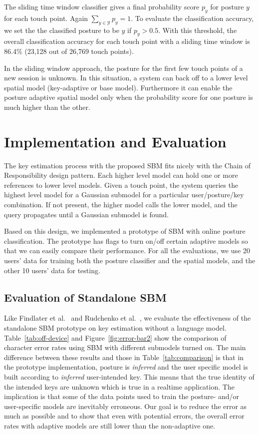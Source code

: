 \documentclass{sigchi}
\begin{document}
The sliding time window classifier gives a final probability score $p_y$ for posture
$y$ for each touch point. Again $\displaystyle\sum_{y\in \mathcal{Y}}p_y = 1$. To evaluate the classification accuracy, we set the the
classified posture to be $y$ if $p_y > 0.5$. With this threshold, the overall classification 
accuracy for each touch point with a sliding time window
is 86.4\% (23,128 out of 26,769 touch points).

In the sliding window approach, the posture for the first few touch points  
of a new session is unknown. In this situation, a system can back off to a lower level spatial 
model (key-adaptive or base model). Furthermore it can enable the posture 
adaptive spatial model only when the probability score for one posture is much 
higher than the other.

\section{Implementation and Evaluation}
The key estimation process with the proposed SBM fits nicely with the
Chain of Responsibility design pattern. Each higher level model can
hold one or more references to lower level models. Given a touch
point, the system queries the highest level model for a Gaussian
submodel for a particular user/posture/key combination. If not present, 
the higher model calls the lower model, and the
query propagates until a Gaussian submodel is found. 

Based on this design, we implemented a prototype of SBM with online posture 
classification. The prototype has flags to turn on/off certain adaptive
 models so that we can easily compare their performance. 
 For all the evaluations, we use 20 users' data for training both the posture classifier 
 and the spatial models, and the other 10 users' data for testing. 

\subsection{Evaluation of Standalone SBM}
Like Findlater et al.~\cite{Findlater:2012} and Rudchenko et al.~\cite{Rudchenko:2011}, we evaluate the effectiveness of the standalone SBM  prototype on key estimation without a language model. 
Table~\ref{tab:off-device} and Figure~\ref{fig:error-bar2} show the comparison of
character error rates using SBM with different submodels turned on. The main
difference between these results and those in Table~\ref{tab:comparison} is that
in the prototype implementation,  posture is \textit{inferred} and the user 
specific model is built according to \textit{inferred} user-intended key. This
means that the true identity of the intended keys are unknown which is true
in a realtime application. The implication is that some of the data points used
to train the posture- and/or user-specific models are inevitably erroneous. Our
goal is to reduce the error as much as possible and to show that even with
potential errors, the overall error rates with adaptive models are still  lower
than the non-adaptive one.
\end{document}
